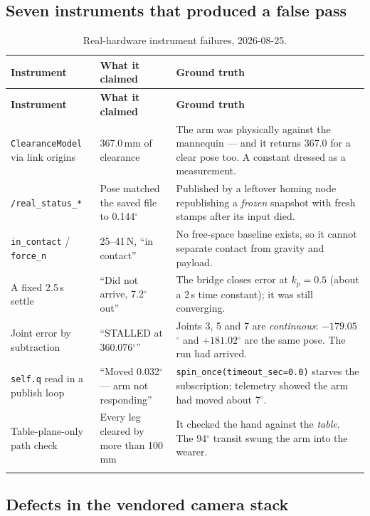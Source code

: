 \documentclass[11pt,a4paper,oneside]{report}
\newcommand{\code}[1]{\texttt{\small #1}}
\newcommand{\dg}{$^{\circ}$}
\begin{document}
\subsection{Seven instruments that produced a false pass}

\begin{longtable}{@{}p{}p{}p{}@{}}
\toprule
\textbf{Instrument} & \textbf{What it claimed} & \textbf{Ground truth} \\
\midrule
\endfirsthead
\toprule
\textbf{Instrument} & \textbf{What it claimed} & \textbf{Ground truth} \\
\midrule
\endhead
\code{ClearanceModel} via link origins & 367.0\,mm of clearance & The arm was
physically against the mannequin --- and it returns 367.0 for a clear pose too.
A constant dressed as a measurement. \\
\code{/real\_status\_*} & Pose matched the saved file to 0.144\dg & Published by
a leftover homing node republishing a \emph{frozen} snapshot with fresh stamps
after its input died. \\
\code{in\_contact} / \code{force\_n} & 25--41\,N, ``in contact'' & No free-space
baseline exists, so it cannot separate contact from gravity and payload. \\
A fixed 2.5\,s settle & ``Did not arrive, 7.2\dg{} out'' & The bridge closes
error at $k_p = 0.5$ (about a 2\,s time constant); it was still converging. \\
Joint error by subtraction & ``STALLED at 360.076\dg'' & Joints 3, 5 and 7 are
\emph{continuous}: $-179.05$\dg{} and $+181.02$\dg{} are the same pose. The run
had arrived. \\
\code{self.q} read in a publish loop & ``Moved 0.032\dg{} --- arm not
responding'' & \code{spin\_once(timeout\_sec=0.0)} starves the subscription;
telemetry showed the arm had moved about 7\dg. \\
Table-plane-only path check & Every leg cleared by more than 100\,mm & It
checked the hand against the \emph{table}. The 94\dg{} transit swung the arm
into the wearer. \\
\bottomrule
\caption{Real-hardware instrument failures, 2026-08-25.}
\end{longtable}

\subsection{Defects in the vendored camera stack}
\end{document}
